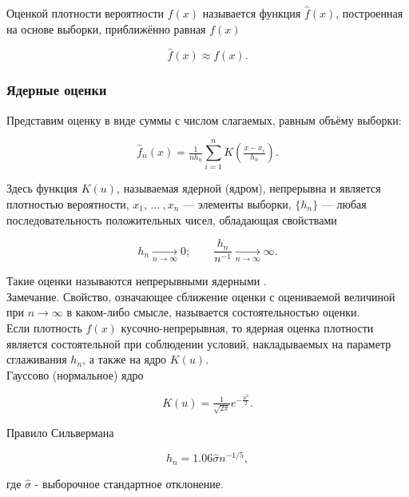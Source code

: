 Оценкой плотности вероятности $f(x)$ называется функция $\widehat{f}(x)$, построенная на основе выборки, приближённо равная $f(x)$

\begin{equation}
	\widehat{f}(x) \approx f(x).
\end{equation}

\subsubsection{Ядерные оценки}

Представим оценку в виде суммы с числом слагаемых, равным объёму выборки:

\begin{equation}
	\widehat{f}_n(x) = \tfrac{1}{nh_n}\sum\limits_{i=1}^n K\left( \tfrac{x - x_i}{h_n} \right).
\end{equation}

Здесь функция $K(u)$, называемая ядерной (ядром), непрерывна и является плотностью вероятности, $x_1, \, ... \: , x_n$ --- элементы выборки, $\{h_n\}$ --- любая последовательность положительных чисел, обладающая свойствами

\begin{equation}
	h_n \underset{n \to \infty}{\longrightarrow} 0; \qquad \dfrac{h_n}{n^{-1}} \underset{n \to \infty}{\longrightarrow} \infty.
\end{equation}

Такие оценки называются непрерывными ядерными \cite[с. 421-423]{b:probSectMath}.\\

Замечание. Свойство, означающее сближение оценки с оцениваемой величиной при $n \rightarrow \infty$ в каком-либо смысле, называется состоятельностью оценки.\\

Если плотность $f(x)$ кусочно-непрерывная, то ядерная оценка плотности является состоятельной при соблюдении условий, накладываемых на параметр сглаживания $h_n$, а также на ядро $K(u)$.\\

Гауссово (нормальное) ядро \cite[с. 38]{a:nonParamRegr}

\begin{equation}
	K(u) = \tfrac{1}{\sqrt{2\pi}}e^{-\tfrac{u^2}{2}}.
\end{equation}

Правило Сильвермана \cite[с. 44]{a:nonParamRegr}

\begin{equation}
	h_n = 1.06\hat{\sigma}n^{-1/5},
\end{equation}

где $\hat{\sigma}$ - выборочное стандартное отклонение.
